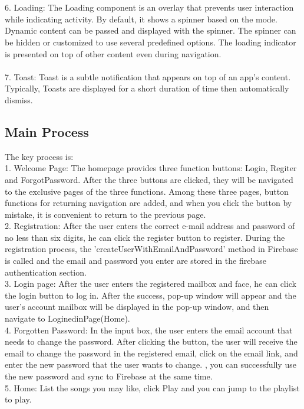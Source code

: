 \\ \\ 
6. Loading: The Loading component is an overlay that prevents user interaction while indicating activity. By default, it shows a spinner based on the mode. Dynamic content can be passed and displayed with the spinner. The spinner can be hidden or customized to use several predefined options. The loading indicator is presented on top of other content even during navigation.
\\ \\ 
7. Toast: Toast is a subtle notification that appears on top of an app’s content. Typically, Toasts are displayed for a short duration of time then automatically dismiss.
\subsection{Main Process}
The key process is: \\
1. Welcome Page: The homepage provides three function buttons: Login, Regiter and ForgotPassword. After the three buttons are clicked, they will be navigated to the exclusive pages of the three functions. Among these three pages, button functions for returning navigation are added, and when you click the button by mistake, it is convenient to return to the previous page.
\\ 2. Registration: After the user enters the correct e-mail address and password of no less than six digits, he can click the register button to register. During the registration process, the 'createUserWithEmailAndPassword' method in Firebase is called and the email and password you enter are stored in the firebase authentication section\cite{3}.
\\ 3. Login page: After the user enters the registered mailbox and face, he can click the login button to log in. After the success, pop-up window will appear and the user's account mailbox will be displayed in the pop-up window, and then navigate to LoginedinPage(Home).
\\ 4. Forgotten Password: In the input box, the user enters the email account that needs to change the password. After clicking the button, the user will receive the email to change the password in the registered email, click on the email link, and enter the new password that the user wants to change. , you can successfully use the new password and sync to Firebase at the same time.
\\ 5. Home: List the songs you may like, click Play and you can jump to the playlist to play.
